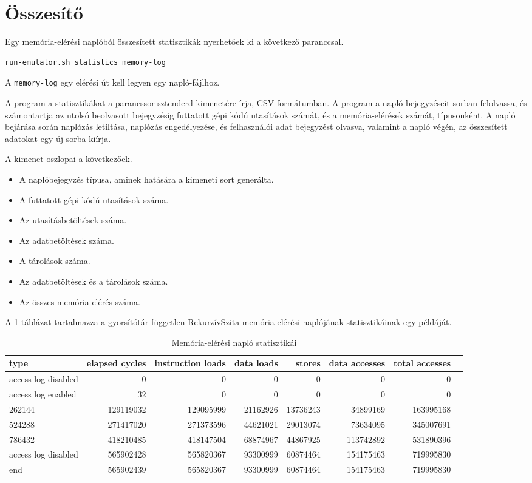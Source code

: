\documentclass[12pt]{report}
\begin{document}
\section{Összesítő}

Egy memória-elérési naplóból összesített statisztikák nyerhetőek ki a következő paranccsal.
\begin{verbatim}
run-emulator.sh statistics memory-log
\end{verbatim}
A \texttt{memory-log} egy elérési út kell legyen egy napló-fájlhoz.

A program a statisztikákat a parancssor sztenderd kimenetére írja,
CSV formátumban.
A program a napló bejegyzéseit sorban felolvassa,
és számontartja az utolsó beolvasott bejegyzésig futtatott gépi kódú
utasítások számát, és a memória-elérések számát, típusonként.
A napló bejárása során naplózás letiltása, naplózás engedélyezése,
és felhasználói adat bejegyzést olvasva, valamint a napló végén,
az összesített adatokat egy új sorba kiírja.

A kimenet oszlopai a következőek.
\begin{itemize}
\item A naplóbejegyzés típusa, aminek hatására a kimeneti sort generálta.
\item A futtatott gépi kódú utasítások száma.
\item Az utasításbetöltések száma.
\item Az adatbetöltések száma.
\item A tárolások száma.
\item Az adatbetöltések és a tárolások száma.
\item Az összes memória-elérés száma.
\end{itemize}

A \ref{table-statistics} táblázat tartalmazza a gyorsítótár-független RekurzívSzita
memória-elérési naplójának statisztikáinak egy példáját.

\begin{table}[ht]
\centering
\caption{Memória-elérési napló statisztikái}
\label{table-statistics}
{\tiny
\begin{tabular}{|l|r|r|r|r|r|r|r|}
\hline
type & elapsed cycles & instruction loads & data loads & stores & data accesses & total accesses \\
\hline
access log disabled & 0 & 0 & 0 & 0 & 0 & 0 \\
\hline
access log enabled & 32 & 0 & 0 & 0 & 0 & 0 \\
\hline
262144 & 129119032 & 129095999 & 21162926 & 13736243 & 34899169 & 163995168 \\
\hline
524288 & 271417020 & 271373596 & 44621021 & 29013074 & 73634095 & 345007691 \\
\hline
786432 & 418210485 & 418147504 & 68874967 & 44867925 & 113742892 & 531890396 \\
\hline
access log disabled & 565902428 & 565820367 & 93300999 & 60874464 & 154175463 & 719995830 \\
\hline
end & 565902439 & 565820367 & 93300999 & 60874464 & 154175463 & 719995830 \\
\hline
\end{tabular}
}
\end{table}
\end{document}
